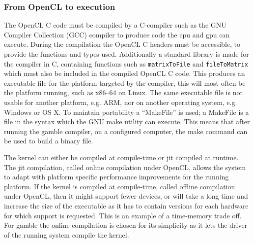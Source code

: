 \subsubsection*{From OpenCL to execution}\label{ssub:makefile}
The OpenCL C code must be compiled by a C-compiler such as the GNU Compiler Collection (GCC) compiler to produce code the \acrshort{cpu} and \acrshort{gpu} can execute.
During the compilation the OpenCL C headers must be accessible, to provide the functions and types used. 
Additionally a standard library is made for the compiler in C, containing functions such as \texttt{matrixToFile} and \texttt{fileToMatrix} which must also be included in the compiled OpenCL C code.
This produces an executable file for the platform targeted by the compiler, this will most often be the platform running, such as x86--64 on Linux.
The same executable file is not usable for another platform, e.g. ARM, nor on another operating system, e.g. Windows or OS X.
To maintain portability a ``MakeFile'' is used; a MakeFile is a file in the syntax which the GNU make utility can execute. 
This means that after running the \gls{gamble} compiler, on a configured computer, the make command can be used to build a binary file.

The kernel can either be compiled at compile-time or \acrshort{jit} compiled at runtime.
The \acrshort{jit} compilation, called online compilation under OpenCL, allows the system to adapt with platform specific performance improvements for the running platform.
If the kernel is compiled at compile-time, called offline compilation under OpenCL, then it might support fewer devices, or will take a long time and increase the size of the executable as it has to contain versions for each hardware for which support is requested. \citep{openclbookjit}
This is an example of a time-memory trade off. 
For \gls{gamble} the online compilation is chosen for its simplicity as it lets the driver of the running system compile the kernel. 